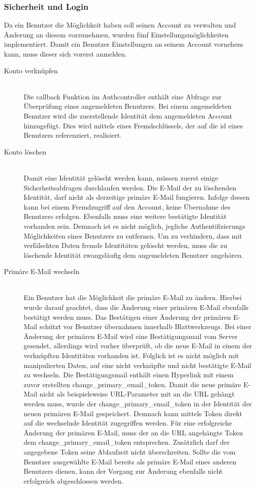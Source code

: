 \subsubsection{Sicherheit und Login}
\label{sec:server-account-settings}
Da ein Benutzer die Möglichkeit haben soll seinen Account zu verwalten und Änderung an diesem vorzunehmen, wurden fünf Einstellungsmöglichkeiten implementiert. Damit ein Benutzer Einstellungen an seinem Account vornehem kann, muss dieser sich vorerst anmelden.

\begin{description}
	\item[Konto verknüpfen]\hfill\\
	Die callback Funktion im Authcontroller enthält eine Abfrage zur Überprüfung eines angemeldeten Benutzers. Bei einem angemeldeten Benutzer wird die zuerstellende Identität dem angemeldeten Account hinzugefügt. Dies wird mittels eines Fremdschlüssels, der auf die id eines Benutzers referenziert, realisiert.
	\item[Konto löschen]\hfill\\
	Damit eine Identität gelöscht werden kann, müssen zuerst einige Sicherheitsabfragen durchlaufen werden. Die E-Mail der zu löschenden Identität, darf nicht als derzeitige primäre E-Mail fungieren. Infolge dessen kann bei einem Fremdzugriff auf den Account, keine Übernahme des Benutzers erfolgen. Ebenfalls muss eine weitere bestätigte Identität vorhanden sein. Demnach ist es nicht möglich, jegliche Authentifizierungs Möglichkeiten eines Benutzers zu entfernen. Um zu verhindern, dass mit verfälschten Daten fremde Identitäten gelöscht werden, muss die zu löschende Identität zwangsläufig dem angemeldeten Benutzer angehören.
	\item[Primäre E-Mail wechseln]\hfill\\
	Ein Benutzer hat die Möglichkeit die primäre E-Mail zu ändern. Hierbei wurde darauf geachtet, dass die Änderung einer primären E-Mail ebenfalls bestätigt werden muss. Das Bestätigen einer Änderung der primären E-Mail schützt vor Benutzer übernahmen innerhalb Blattwerkzeugs. Bei einer Änderung der primären E-Mail wird eine Bestätigungsmail vom Server gesendet, allerdings wird vorher überprüft, ob die neue E-Mail in einem der verknüpften Identitäten vorhanden ist. Folglich ist es nicht möglich mit manipulierten Daten, auf eine nicht verknüpfte und nicht bestätigte E-Mail zu wechseln. Die Bestätigungsmail enthält einen Hyperlink mit einem zuvor erstellten change\_primary\_email\_token. Damit die neue primäre E-Mail nicht als beispielsweise URL-Parameter mit an die \gls{URL} gehängt werden muss, wurde der change\_primary\_email\_token in der Identität der neuen primären E-Mail gespeichert. Demnach kann mittels Token direkt auf die wechselnde Identität zugegriffen werden. Für eine erfolgreiche Änderung der primären E-Mail, muss der an die \gls{URL} angehängte Token dem change\_primary\_email\_token entsprechen. Zusätzlich darf der angegebene Token seine Ablaufzeit nicht überschreiten. Sollte die vom Benutzer ausgewählte E-Mail bereits als primäre E-Mail eines anderen Benutzers dienen, kann der Vorgang zur Änderung ebenfalls nicht erfolgreich abgeschlossen werden.

\end{description}
